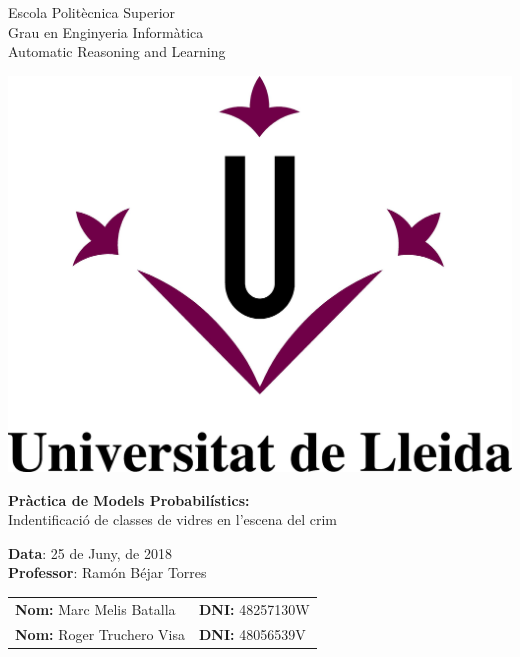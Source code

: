 \documentclass[11pt,a4paper]{article}
\begin{document}
\begin{titlepage}

\begin{flushleft}
Escola Politècnica Superior\\
\vspace*{0.15in}
Grau en Enginyeria Informàtica\\
\vspace*{0.15in}
Automatic Reasoning and Learning
\end{flushleft}

\begin{center}
\vspace{2.0cm}
\includegraphics[scale=0.3]{Figures/M-UdL.jpg} 
\vspace{2.0cm}

\begin{LARGE}
\textbf{Pràctica de Models Probabilístics:}\\ 
\vspace*{0.15in}
Indentificació de classes de vidres en l'escena del crim
\end{LARGE}
\vspace{1.0cm}

\begin{large}
\textbf{Data}: 25 de Juny, de 2018 \\
\textbf{Professor}: Ramón Béjar Torres \\
\begin{tabular}{ll}
\textbf{Nom: }Marc Melis Batalla & \textbf{DNI: }48257130W \\
\textbf{Nom: }Roger Truchero Visa  & \textbf{DNI: }48056539V \\
\end{tabular}
\end{large}


\end{center}
\end{titlepage}
\end{document}
